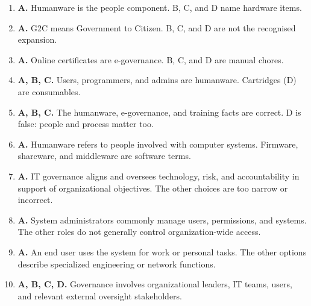 \begin{enumerate}[label=\textbf{Q\arabic*.}, leftmargin=*]
\item \textbf{A.} Humanware is the people component. B, C, and D name hardware items.
\item \textbf{A.} G2C means Government to Citizen. B, C, and D are not the recognised expansion.
\item \textbf{A.} Online certificates are e-governance. B, C, and D are manual chores.
\item \textbf{A, B, C.} Users, programmers, and admins are humanware. Cartridges (D) are consumables.
\item \textbf{A, B, C.} The humanware, e-governance, and training facts are correct. D is false: people and process matter too.
\item \textbf{A.} Humanware refers to people involved with computer systems. Firmware, shareware, and middleware are software terms.

\item \textbf{A.} IT governance aligns and oversees technology, risk, and accountability in support of organizational objectives. The other choices are too narrow or incorrect.

\item \textbf{A.} System administrators commonly manage users, permissions, and systems. The other roles do not generally control organization-wide access.

\item \textbf{A.} An end user uses the system for work or personal tasks. The other options describe specialized engineering or network functions.

\item \textbf{A, B, C, D.} Governance involves organizational leaders, IT teams, users, and relevant external oversight stakeholders.

\end{enumerate}
